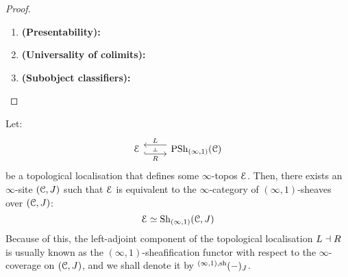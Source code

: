                     \begin{proof}
                        \noindent
                        \begin{enumerate}
                            \item \textbf{(Presentability):} 
                            \item \textbf{(Universality of colimits):}
                            \item \textbf{(Subobject classifiers):}
                        \end{enumerate}
                    \end{proof}
                \begin{corollary} \label{coro: infinity_topoi_are_sheaf_topoi}
                    Let:
                        $$
                            \begin{tikzcd}
                            	\E & \Psh_{(\infty, 1)}(\C)
                            	\arrow[""{name=0, anchor=center, inner sep=0}, "L"', shift right=2, from=1-2, to=1-1]
                            	\arrow[""{name=1, anchor=center, inner sep=0}, "R"', shift right=2, hook, from=1-1, to=1-2]
                            	\arrow["\dashv"{anchor=center, rotate=-90}, draw=none, from=0, to=1]
                            \end{tikzcd}
                        $$
                    be a topological localisation that defines some $\infty$-topos $\mathcal{E}$. Then, there exists an $\infty$-site $(\mathcal{C}, J)$ such that $\mathcal{E}$ is equivalent to the $\infty$-category of $(\infty, 1)$-sheaves over $(\mathcal{C}, J)$:
                        $$\mathcal{E} \simeq \mathrm{Sh}_{(\infty, 1)}(\mathcal{C}, J)$$
                    Because of this, the left-adjoint component of the topological localisation $L \dashv R$ is usually known as the $(\infty, 1)$-sheafification functor with respect to the $\infty$-coverage on $(\mathcal{C}, J)$, and we shall denote it by ${}^{(\infty, 1), \mathrm{sh}}(-)_J$.
                \end{corollary}
            
